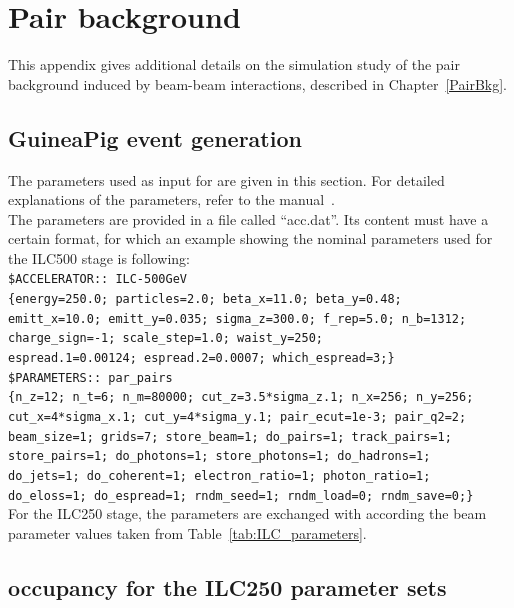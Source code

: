 \chapter{Pair background}
\label{Appendix:Pairs}

This appendix gives additional details on the simulation study of the pair background induced by beam-beam interactions, described in Chapter~\ref{PairBkg}.

\section{GuineaPig event generation}
\label{Appendix:Pairs:GuineaPig}
The parameters used as input for \guineapig are given in this section.
For detailed explanations of the \guineapig parameters, refer to the \guineapig manual~\cite{GuineaPigMan}.
\\The parameters are provided in a file called ``acc.dat''.
Its content must have a certain format, for which an example showing the nominal parameters used for the ILC500 stage is following:\vspace*{0.1cm}\\
\texttt{\$ACCELERATOR:: ILC-500GeV\\
\{energy=250.0; particles=2.0; beta\_x=11.0; beta\_y=0.48;\\
emitt\_x=10.0; emitt\_y=0.035; sigma\_z=300.0; f\_rep=5.0; n\_b=1312;\\
charge\_sign=-1; scale\_step=1.0; waist\_y=250;\\
espread.1=0.00124; espread.2=0.0007; which\_espread=3;\}\\
\$PARAMETERS:: par\_pairs\\
\{n\_z=12; n\_t=6; n\_m=80000; cut\_z=3.5*sigma\_z.1; n\_x=256; n\_y=256;\\
cut\_x=4*sigma\_x.1; cut\_y=4*sigma\_y.1; pair\_ecut=1e-3; pair\_q2=2;\\
beam\_size=1; grids=7; store\_beam=1; do\_pairs=1; track\_pairs=1;\\
store\_pairs=1; do\_photons=1; store\_photons=1; do\_hadrons=1;\\
do\_jets=1; do\_coherent=1; electron\_ratio=1; photon\_ratio=1;\\
do\_eloss=1; do\_espread=1; rndm\_seed=1; rndm\_load=0; rndm\_save=0;\}
}
\vspace*{0.2cm}\\For the ILC250 stage, the parameters are exchanged with according the beam parameter values taken from Table~\ref{tab:ILC_parameters}.
\newpage
\section{\sid occupancy for the ILC250 parameter sets}
\label{Appendix:Pairs:ILC250_occupancy}

